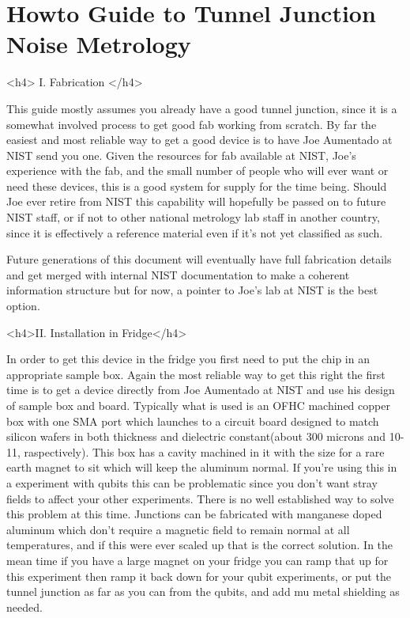 \documentclass[11pt]{article}
\begin{document}
\section{
Howto Guide to Tunnel Junction Noise Metrology}

<h4> I. Fabrication </h4>




This guide mostly assumes you already have a good tunnel junction, since it is a somewhat involved process to get good fab working from scratch. By far the easiest and most reliable way to get a good device is to have Joe Aumentado at NIST send you one.  Given the resources for fab available at NIST, Joe's experience with the fab, and the small number of people who will ever want or need these devices, this is a good system for supply for the time being.  Should Joe ever retire from NIST this capability will hopefully be passed on to future NIST staff, or if not to other national metrology lab staff in another country, since it is effectively a reference material even if it's not yet classified as such.    




    Future generations of this document will eventually have full fabrication details and get merged with internal NIST documentation to make a coherent information structure but for now, a pointer to Joe's lab at NIST is the best option.


<h4>II. Installation in Fridge</h4>



In order to get this device in the fridge you first need to put the chip in an appropriate sample box.  Again the most reliable way to get this right the first time is to get a device directly from Joe Aumentado at NIST and use his design of sample box and board.  Typically what is used is an OFHC machined copper box with one SMA port which launches to a circuit board designed to match silicon wafers in both thickness and dielectric constant(about 300 microns and 10-11, raspectively).  This box has a cavity machined in it with the size for a rare earth magnet to sit which will keep the aluminum normal.  If you're using this in a experiment with qubits this can be problematic since you don't want stray fields to affect your other experiments.  There is no well established way to solve this problem at this time.  Junctions can be fabricated with manganese doped aluminum which don't require a magnetic field to remain normal at all temperatures, and if this were ever scaled up that is the correct solution.  In the mean time if you have a large magnet on your fridge you can ramp that up for this experiment then ramp it back down for your qubit experiments, or put the tunnel junction as far as you can from the qubits, and add mu metal shielding as needed.
\end{document}
